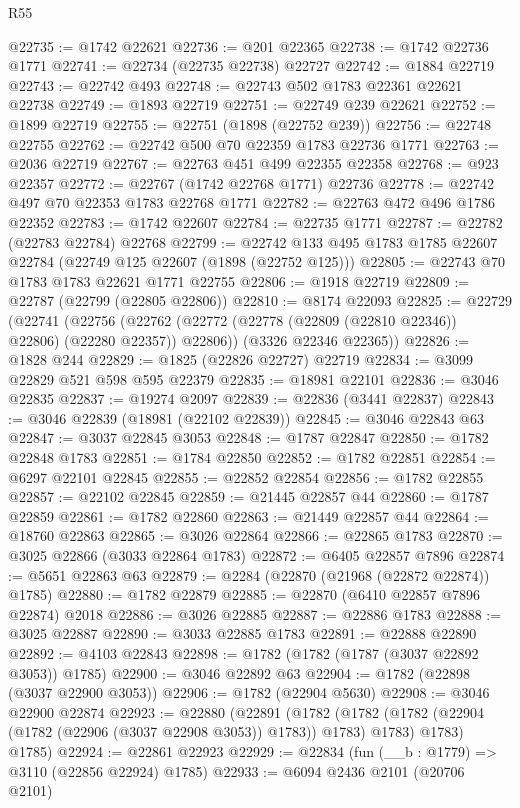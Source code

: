 \begin{lexlean}{R55}
\begin{coremodule}
@22735 := @1742 @22621
@22736 := @201 @22365
@22738 := @1742 @22736 @1771
@22741 := @22734 (@22735 @22738) @22727
@22742 := @1884 @22719
@22743 := @22742 @493
@22748 := @22743 @502 @1783 @22361 @22621 @22738
@22749 := @1893 @22719
@22751 := @22749 @239 @22621
@22752 := @1899 @22719
@22755 := @22751 (@1898 (@22752 @239))
@22756 := @22748 @22755
@22762 := @22742 @500 @70 @22359 @1783 @22736 @1771
@22763 := @2036 @22719
@22767 := @22763 @451 @499 @22355 @22358
@22768 := @923 @22357
@22772 := @22767 (@1742 @22768 @1771) @22736
@22778 := @22742 @497 @70 @22353 @1783 @22768 @1771
@22782 := @22763 @472 @496 @1786 @22352
@22783 := @1742 @22607
@22784 := @22735 @1771
@22787 := @22782 (@22783 @22784) @22768
@22799 := @22742 @133 @495 @1783 @1785 @22607 @22784 (@22749 @125 @22607 (@1898 (@22752 @125)))
@22805 := @22743 @70 @1783 @1783 @22621 @1771 @22755
@22806 := @1918 @22719
@22809 := @22787 (@22799 (@22805 @22806))
@22810 := @8174 @22093
@22825 := @22729
    (@22741
      (@22756 (@22762 (@22772 (@22778 (@22809 (@22810 @22346)) @22806) (@22280 @22357)) @22806))
      (@3326 @22346 @22365))
@22826 := @1828 @244
@22829 := @1825 (@22826 @22727) @22719
@22834 := @3099 @22829 @521 @598 @595 @22379
@22835 := @18981 @22101
@22836 := @3046 @22835
@22837 := @19274 @2097
@22839 := @22836 (@3441 @22837)
@22843 := @3046 @22839 (@18981 (@22102 @22839))
@22845 := @3046 @22843 @63
@22847 := @3037 @22845 @3053
@22848 := @1787 @22847
@22850 := @1782 @22848 @1783
@22851 := @1784 @22850
@22852 := @1782 @22851
@22854 := @6297 @22101 @22845
@22855 := @22852 @22854
@22856 := @1782 @22855
@22857 := @22102 @22845
@22859 := @21445 @22857 @44
@22860 := @1787 @22859
@22861 := @1782 @22860
@22863 := @21449 @22857 @44
@22864 := @18760 @22863
@22865 := @3026 @22864
@22866 := @22865 @1783
@22870 := @3025 @22866 (@3033 @22864 @1783)
@22872 := @6405 @22857 @7896
@22874 := @5651 @22863 @63
@22879 := @2284 (@22870 (@21968 (@22872 @22874)) @1785)
@22880 := @1782 @22879
@22885 := @22870 (@6410 @22857 @7896 @22874) @2018
@22886 := @3026 @22885
@22887 := @22886 @1783
@22888 := @3025 @22887
@22890 := @3033 @22885 @1783
@22891 := @22888 @22890
@22892 := @4103 @22843
@22898 := @1782 (@1782 (@1787 (@3037 @22892 @3053)) @1785)
@22900 := @3046 @22892 @63
@22904 := @1782 (@22898 (@3037 @22900 @3053))
@22906 := @1782 (@22904 @5630)
@22908 := @3046 @22900 @22874
@22923 := @22880
    (@22891
      (@1782 (@1782 (@1782 (@22904 (@1782 (@22906 (@3037 @22908 @3053)) @1783)) @1783) @1783) @1783)
      @1785)
@22924 := @22861 @22923
@22929 := @22834 (fun (__b : @1779) => @3110 (@22856 @22924) @1785)
@22933 := @6094 @2436 @2101 (@20706 @2101)

\end{coremodule}
\end{lexlean}
